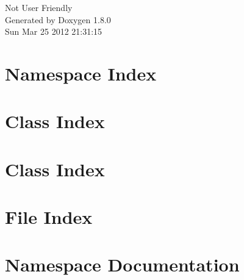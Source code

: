\documentclass{book}
\begin{document}
\hypersetup{pageanchor=false,citecolor=blue}
\begin{titlepage}
\vspace*{7cm}
\begin{center}
{\Large Not User Friendly }\\
\vspace*{1cm}
{\large Generated by Doxygen 1.8.0}\\
\vspace*{0.5cm}
{\small Sun Mar 25 2012 21:31:15}\\
\end{center}
\end{titlepage}
\clearemptydoublepage
{}
\tableofcontents
\clearemptydoublepage
{}
\hypersetup{pageanchor=true,citecolor=blue}
\chapter{Namespace Index}

\chapter{Class Index}

\chapter{Class Index}

\chapter{File Index}

\chapter{Namespace Documentation}























\end{document}
